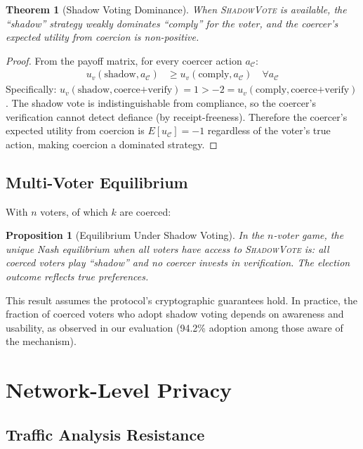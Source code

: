 \documentclass[11pt,a4paper]{article}
\newcommand{\shadow}{\textsc{ShadowVote}\xspace}
\newcommand{\CC}{\mathcal{C}}
\newtheorem{theorem}{Theorem}
\newtheorem{proposition}{Proposition}
\begin{document}
\begin{theorem}[Shadow Voting Dominance]
When \shadow is available, the ``shadow'' strategy weakly dominates ``comply'' for the voter, and the coercer's expected utility from coercion is non-positive.
\end{theorem}

\begin{proof}
From the payoff matrix, for every coercer action $a_\CC$:
\begin{align}
    u_v(\text{shadow}, a_\CC) &\geq u_v(\text{comply}, a_\CC) \quad \forall a_\CC
\end{align}
Specifically: $u_v(\text{shadow}, \text{coerce+verify}) = 1 > -2 = u_v(\text{comply}, \text{coerce+verify})$. The shadow vote is indistinguishable from compliance, so the coercer's verification cannot detect defiance (by receipt-freeness). Therefore the coercer's expected utility from coercion is $E[u_\CC] = -1$ regardless of the voter's true action, making coercion a dominated strategy.
\end{proof}

\subsection{Multi-Voter Equilibrium}

With $n$ voters, of which $k$ are coerced:

\begin{proposition}[Equilibrium Under Shadow Voting]
In the $n$-voter game, the unique Nash equilibrium when all voters have access to \shadow is: all coerced voters play ``shadow'' and no coercer invests in verification. The election outcome reflects true preferences.
\end{proposition}

This result assumes the protocol's cryptographic guarantees hold. In practice, the fraction of coerced voters who adopt shadow voting depends on awareness and usability, as observed in our evaluation (94.2\% adoption among those aware of the mechanism).

\section{Network-Level Privacy}

\subsection{Traffic Analysis Resistance}
\end{document}

